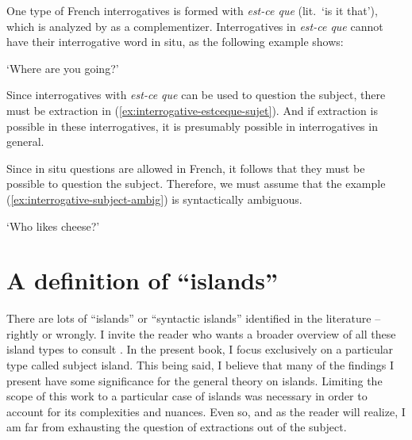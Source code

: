 One type of French interrogatives is formed with \emph{est-ce que} (lit.\ `is it that'), which is analyzed by \citet{Abeille.2012} as a complementizer. Interrogatives in \emph{est-ce que} cannot have their interrogative word in situ, as the following example shows:

\eal 
{}
\glt `Where are you going?'
\zl 

Since interrogatives with \emph{est-ce que} can be used to question the subject, there must be extraction in (\ref{ex:interrogative-estceque-sujet}). And if extraction is possible in these interrogatives, it is presumably possible in interrogatives in general. 

\label{ex:interrogative-estceque-sujet}
\z 

Since in situ questions are allowed in French, it follows that they must be possible to question the subject. Therefore, we must assume that the example (\ref{ex:interrogative-subject-ambig}) is syntactically ambiguous. 

\eal \label{ex:interrogative-subject-ambig}
\glt `Who likes cheese?'
\zl 

\section{A definition of ``islands''}

There are lots of ``islands'' or ``syntactic islands'' identified in the literature -- rightly or wrongly. I invite the reader who wants a broader overview of all these island types to consult \citet{Chaves.2020.UDC}. In the present book, I focus exclusively on a particular type called subject island. This being said, I believe that many of the findings I present have some significance for the general theory on islands. Limiting the scope of this work to a particular case of islands was necessary in order to account for its complexities and nuances. Even so, and as the reader will realize, I am far from exhausting the question of extractions out of the subject.

